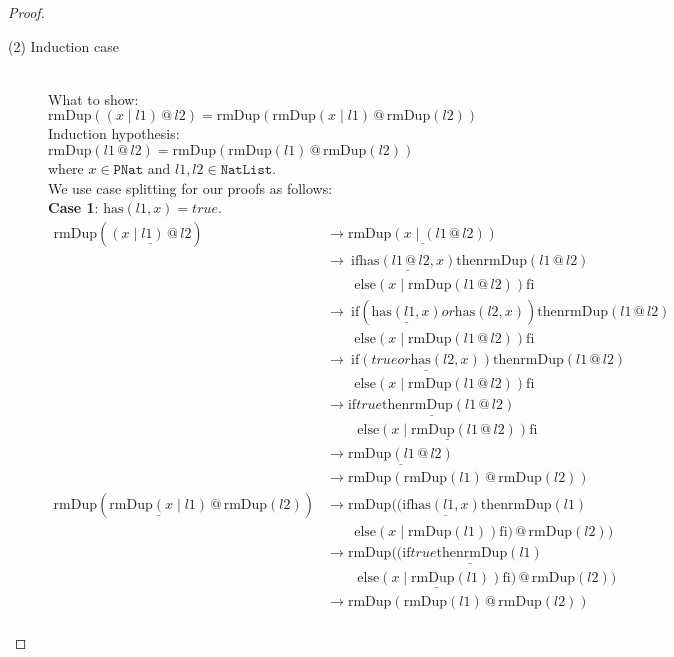 \documentclass[12pt, a4paper]{article}
\newcommand{\rel}[1]{\mathrel{#1}}
\newcommand{\rmx}[1]{\mathrm{#1}}
\newcommand{\larrow}{\longrightarrow}
\newcommand{\under}{\underline}
\begin{document}
\begin{proof}
\begin{description}
\item[(2) Induction case]~\\
What to show: $\rmx{rmDup}((x \mid l1) \rel{@} l2) = \rmx{rmDup}(\rmx{rmDup}(x \mid l1) \rel{@} \rmx{rmDup}(l2))$\\
Induction hypothesis: $\rmx{rmDup}(l1 \rel{@} l2) = \rmx{rmDup}(\rmx{rmDup}(l1) \rel{@} \rmx{rmDup}(l2))$  \\
where $x \in \mathtt{PNat}$ and $l1, l2 \in \mathtt{NatList}$.\\
We use case splitting for our proofs as follows: \\
\textbf{Case 1}: $\rmx{has}(l1, x) = true$.
\begin{align*}
\rmx{rmDup}(\under{(x \mid l1) \rel{@} l2})
	&\larrow \under{\rmx{rmDup}(x \mid (l1 \rel{@} l2))} \tag{by @2} \\
	&\larrow\ \rel{\rmx{if}} \under{\rmx{has}(l1 \rel{@} l2, x)} \rel{\rmx{then}} \rmx{rmDup}(l1 \rel{@} l2) \\
	&\quad \quad \rel{\rmx{else}} (x \mid \rmx{rmDup}(l1 \rel{@} l2)) \rel{\rmx{fi}} \tag{by rmDup2} \\
	&\larrow\ \rel{\rmx{if}} (\under{\rmx{has}(l1, x)} \rel{or} \rmx{has}(l2, x)) \rel{\rmx{then}} \rmx{rmDup}(l1 \rel{@} l2) \\
	&\quad \quad \rel{\rmx{else}} (x \mid \rmx{rmDup}(l1 \rel{@} l2)) \rel{\rmx{fi}} \tag{by Problem 6 - Lemma 1} \\
	&\larrow\ \rel{\rmx{if}} \under{(true \rel{or} \rmx{has}(l2, x))} \rel{\rmx{then}} \rmx{rmDup}(l1 \rel{@} l2) \\
	&\quad \quad \rel{\rmx{else}} (x \mid \rmx{rmDup}(l1 \rel{@} l2)) \rel{\rmx{fi}} \tag{by case splitting} \\
	&\larrow \under{\rel{\rmx{if}} true \rel{\rmx{then}} \rmx{rmDup}(l1 \rel{@} l2)} \\
	&\quad \quad\ \under{\rel{\rmx{else}} (x \mid \rmx{rmDup}(l1 \rel{@} l2)) \rel{\rmx{fi}}} \tag{by or} \\
	&\larrow \under{\rmx{rmDup}(l1 \rel{@} l2)} \tag{by if1} \\
	&\larrow \rmx{rmDup}(\rmx{rmDup}(l1) \rel{@} \rmx{rmDup}(l2)) \tag{by IH} \\
\rmx{rmDup}(\under{\rmx{rmDup}(x \mid l1)} \rel{@} \rmx{rmDup}(l2))
	&\larrow \rmx{rmDup}((\rel{\rmx{if}} \under{\rmx{has}(l1, x)} \rel{\rmx{then}} \rmx{rmDup}(l1) \\
	&\quad \quad \rel{\rmx{else}} (x \mid \rmx{rmDup}(l1)) \rel{\rmx{fi}}) \rel{@} \rmx{rmDup}(l2)) \tag{by rmDup2} \\
	&\larrow \rmx{rmDup}(\under{(\rel{\rmx{if}} true \rel{\rmx{then}} \rmx{rmDup}(l1)} \\
	&\quad \quad\ \under{\rel{\rmx{else}} (x \mid \rmx{rmDup}(l1)) \rel{\rmx{fi}})} \rel{@} \rmx{rmDup}(l2)) \tag{by case splitting} \\
	&\larrow \rmx{rmDup}(\rmx{rmDup}(l1) \rel{@} \rmx{rmDup}(l2)) \tag{by if1} \\
\end{align*}


\end{description}
\end{proof}
\end{document}
